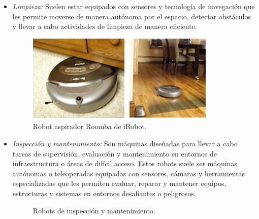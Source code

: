 \begin{itemize}
 \item \textit{Limpieza:} Suelen estar equipados con sensores y tecnología de navegación que les permite moverse de manera autónoma por el espacio, detectar obstáculos y llevar a cabo actividades de limpieza de manera eficiente. 
 
 \begin{figure} [h!]
  \begin{center}
    \includegraphics[width=90mm]{figs/roomba}
  \end{center}
  \caption{Robot aspirador Roomba de iRobot.}
  \label{fig:roomba}
 \end{figure}
 
 \item \textit{Inspección y mantenimiento:} Son máquinas diseñadas para llevar a cabo tareas de supervisión, evaluación y mantenimiento en entornos de infraestructura o áreas de difícil acceso. Estos robots suele ser máquinas autónomas o teleoperadas equipadas con sensores, cámaras y herramientas especializadas que les permiten evaluar, reparar y mantener equipos, estructuras y sistemas en entornos desafiantes o peligrosos. 
 
 \begin{figure}[h!]
    \begin{center}
      \subcapcentertrue
      \hspace{2mm}
    \end{center}
    \caption{Robots de inspección y mantenimiento.}
    \label{fig:Robots de inspección y mantenimiento}
  \end{figure}
 

\end{itemize}
